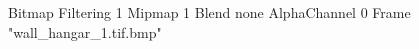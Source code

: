 {Bitmap
	{Filtering 1}
	{Mipmap 1}
	{Blend none}
	{AlphaChannel 0}
	{Frame "wall_hangar_1.tif.bmp"}
}
